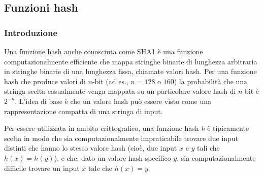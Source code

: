 \documentclass{article}
\theoremstyle{definition}
\begin{document}
\subsection{Funzioni hash}


\subsubsection{Introduzione} %
Una funzione hash anche conosciuta come \emph{} {SHA1} è una funzione computazionalmente efficiente che mappa stringhe binarie di lunghezza arbitraria in stringhe binarie di una lunghezza fissa, chiamate valori hash. Per una funzione hash che produce valori di \(n\)-bit (ad es., \(n = 128\) o \(160\)) la probabilità che una stringa scelta casualmente venga mappata su un particolare valore hash di \(n\)-bit è \(2^{-n}\). L'idea di base è che un valore hash può essere visto come una rappresentazione compatta di una stringa di input.

Per essere utilizzata in ambito crittografico, una funzione hash \textit{h} è tipicamente scelta in modo che sia computazionalmente impraticabile trovare due input distinti che hanno lo stesso valore hash (cioè, due input \(x\) e \(y\) tali che \(h(x) = h(y)\)), e che, dato un valore hash specifico \(y\), sia computazionalmente difficile trovare un input \(x\) tale che \(h(x) = y\).
\end{document}
